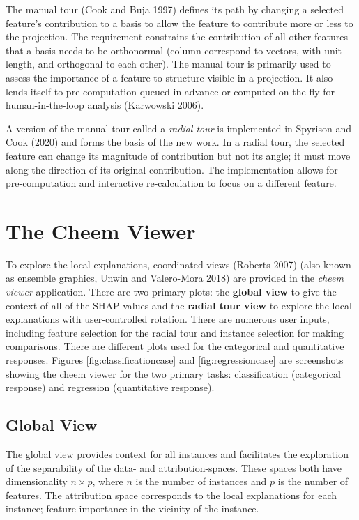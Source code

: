 \documentclass[11pt,twoside]{article}
\begin{document}
The manual tour (Cook and Buja 1997) defines its path by changing a selected feature's contribution to a basis to allow the feature to contribute more or less to the projection. The requirement constrains the contribution of all other features that a basis needs to be orthonormal (column correspond to vectors, with unit length, and orthogonal to each other). The manual tour is primarily used to assess the importance of a feature to structure visible in a projection. It also lends itself to pre-computation queued in advance or computed on-the-fly for human-in-the-loop analysis (Karwowski 2006).

A version of the manual tour called a \emph{radial tour} is implemented in Spyrison and Cook (2020) and forms the basis of the new work. In a radial tour, the selected feature can change its magnitude of contribution but not its angle; it must move along the direction of its original contribution. The implementation allows for pre-computation and interactive re-calculation to focus on a different feature.

\hypertarget{sec:cheemviewer}{%
\section{The Cheem Viewer}\label{sec:cheemviewer}}

To explore the local explanations, coordinated views (Roberts 2007) (also known as ensemble graphics, Unwin and Valero-Mora 2018) are provided in the \emph{cheem viewer} application. There are two primary plots: the \textbf{global view} to give the context of all of the SHAP values and the \textbf{radial tour view} to explore the local explanations with user-controlled rotation. There are numerous user inputs, including feature selection for the radial tour and instance selection for making comparisons. There are different plots used for the categorical and quantitative responses. Figures \ref{fig:classificationcase} and \ref{fig:regressioncase} are screenshots showing the cheem viewer for the two primary tasks: classification (categorical response) and regression (quantitative response).

\hypertarget{global-view}{%
\subsection{Global View}\label{global-view}}

The global view provides context for all instances and facilitates the exploration of the separability of the data- and attribution-spaces. These spaces both have dimensionality \(n \times p\), where \(n\) is the number of instances and \(p\) is the number of features. The attribution space corresponds to the local explanations for each instance; feature importance in the vicinity of the instance.
\end{document}
